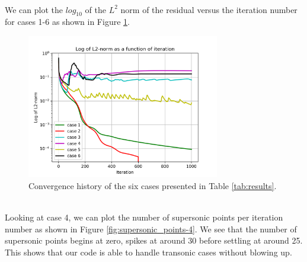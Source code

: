 \documentclass[12pt]{article}
\theoremstyle{definition}
\begin{document}
\vspace{1cm}


\\

We can plot the $log_{10}$ of the $L^2$ norm of the residual versus the iteration number for cases 1-6 as shown in Figure \ref{fig:residual_history-7.png}.

\begin{figure}
    \centering
    \includegraphics[width=0.75\textwidth,height=\textwidth,keepaspectratio]{images/residual_history-7.png}
    \caption{Convergence history of the six cases presented in Table \ref{tab:results}.}
    \label{fig:residual_history-7.png}
\end{figure}


\vspace{1cm}




\\

Looking at case 4, we can plot the number of supersonic points per iteration number as shown in Figure \ref{fig:supersonic_points-4}. We see that the number of supersonic points begins at zero, spikes at around 30 before settling at around 25. This shows that our code is able to handle transonic cases without blowing up. 
\end{document}
